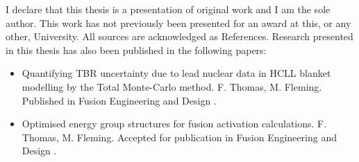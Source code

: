 
\begin{declaration}

I declare that this thesis is a presentation of original work and I am the sole author. This work has not previously been presented for an award at this, or any other, University. All sources are acknowledged as References. Research presented in this thesis has also been published in the following papers:

\begin{itemize}
  \item Quantifying TBR uncertainty due to lead nuclear data in HCLL blanket modelling by the Total Monte-Carlo method. F. Thomas, M. Fleming. Published in Fusion Engineering and Design \cite{}.

  \item Optimised energy group structures for fusion activation calculations. F. Thomas, M. Fleming. Accepted for publication in Fusion Engineering and Design \cite{}.
\end{itemize}

\end{declaration}
